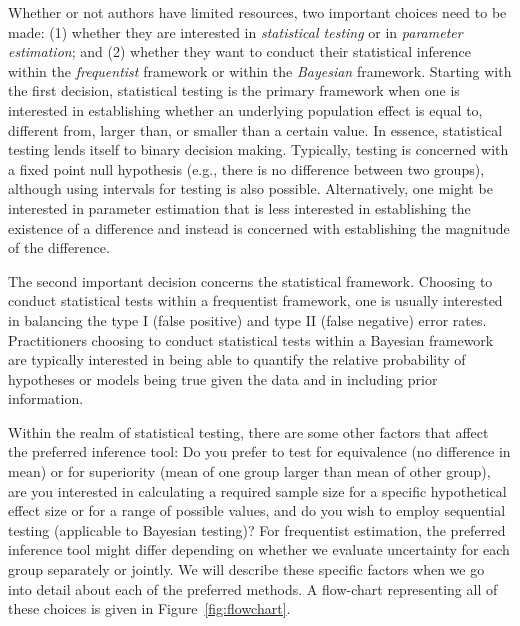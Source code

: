 \documentclass[
  english,
  man,floatsintext]{apa6}
\begin{document}
Whether or not authors have limited resources, two important choices need to be made: (1) whether they are interested in \emph{statistical testing} or in \emph{parameter estimation}; and (2) whether they want to conduct their statistical inference within the \emph{frequentist} framework or within the \emph{Bayesian} framework. Starting with the first decision, statistical testing is the primary framework when one is interested in establishing whether an underlying population effect is equal to, different from, larger than, or smaller than a certain value. In essence, statistical testing lends itself to binary decision making. Typically, testing is concerned with a fixed point null hypothesis (e.g., there is no difference between two groups), although using intervals for testing is also possible. Alternatively, one might be interested in parameter estimation that is less interested in establishing the existence of a difference and instead is concerned with establishing the magnitude of the difference.

The second important decision concerns the statistical framework. Choosing to conduct statistical tests within a frequentist framework, one is usually interested in balancing the type I (false positive) and type II (false negative) error rates. Practitioners choosing to conduct statistical tests within a Bayesian framework are typically interested in being able to quantify the relative probability of hypotheses or models being true given the data and in including prior information.

Within the realm of statistical testing, there are some other factors that affect the preferred inference tool: Do you prefer to test for equivalence (no difference in mean) or for superiority (mean of one group larger than mean of other group), are you interested in calculating a required sample size for a specific hypothetical effect size or for a range of possible values, and do you wish to employ sequential testing (applicable to Bayesian testing)? For frequentist estimation, the preferred inference tool might differ depending on whether we evaluate uncertainty for each group separately or jointly. We will describe these specific factors when we go into detail about each of the preferred methods. A flow-chart representing all of these choices is given in Figure~\ref{fig:flowchart}.
\end{document}
